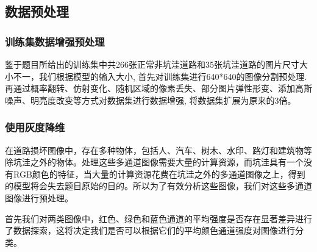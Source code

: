 \documentclass[a4paper, 10pt]{article}
\begin{document}
	\subsection{数据预处理}
	
	\subsubsection{训练集数据增强预处理}
	
	鉴于题目所给出的训练集中共266张正常非坑洼道路和35张坑洼道路的图片尺寸大小不一，我们根据模型的输入大小, 首先对训练集进行640*640的图像分割预处理. 再通过概率翻转、仿射变化、随机区域的像素丢失、部分图片弹性形变、添加高斯噪声、明亮度改变等方式对数据集进行数据增强, 将数据集扩展为原来的3倍。
	
	\subsubsection{使用灰度降维}
	
	在道路损坏图像中，存在多种物体，包括人、汽车、树木、水印、路灯和建筑物等除坑洼之外的物体。处理这些多通道图像需要大量的计算资源，而坑洼具有一个没有RGB颜色的特征，当大量的计算资源花费在坑洼之外的多通道图像之上，得到的模型将会失去题目原始的目的。所以为了有效分析这些图像，我们对这些多通道图像进行预处理。
	
	首先我们对两类图像中，红色、绿色和蓝色通道的平均强度是否存在显著差异进行了数据探索，这将决定我们是否可以根据它们的平均颜色通道强度对图像进行分类。
	
\end{document}
